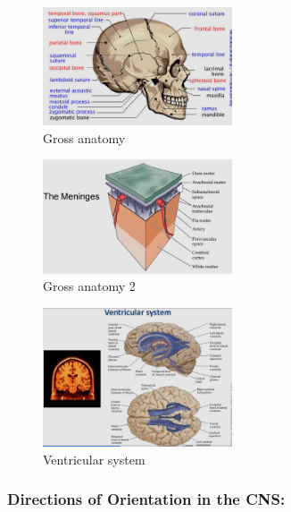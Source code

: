 \documentclass{article}
\begin{document}
    \begin{figure}[H]
    \centering
    \includegraphics[width=0.5\textwidth]{assets/gross-anatomy.png}
    \caption{Gross anatomy}
    \end{figure}
    
    \begin{figure}[H]
    \centering
    \includegraphics[width=0.5\textwidth]{assets/gross-anatomy-2.png}
    \caption{Gross anatomy 2}
    \end{figure}
    
    \begin{figure}[H]
    \centering
    \includegraphics[width=0.5\textwidth]{assets/ventricular-system.png}
    \caption{Ventricular system}
    \end{figure}
    
    \subsubsection{Directions of Orientation in the CNS:}
    
\end{document}
